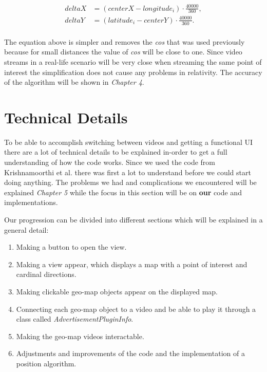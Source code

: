 \begin{align*}
deltaX &= (centerX-longitude_i)\cdot\frac{40000}{360}, \\
deltaY &= (latitude_i-centerY)\cdot\frac{40000}{360}. \\
\end{align*}

The equation above is simpler and removes the \textit{cos} that was used previously because for small distances the value of \textit{cos} will be close to one. Since video streams in a real-life scenario will be very close when streaming the same point of interest the simplification does not cause any problems in relativity. The accuracy of the algorithm will be shown in \textit{Chapter 4}.

\section{Technical Details}
\label{sec:technicaldetails}

To be able to accomplish switching between videos and getting a functional UI there are a lot of technical details to be explained in-order to get a full understanding of how the code works. Since we used the code from Krishnamoorthi et al. \cite{qualbranch} there was first a lot to understand before we could start doing anything. The problems we had and complications we encountered will be explained \textit{Chapter 5} while the focus in this section will be on \textbf{our} code and implementations. 

Our progression can be divided into different sections which will be explained in a general detail:

\begin{enumerate}
\item Making a button to open the view.

\item Making a view appear, which displays a map with a point of interest and cardinal directions.

\item Making clickable geo-map objects appear on the displayed map.

\item Connecting each geo-map object to a video and be able to play it through a class called \textit{AdvertisementPluginInfo}.

\item Making the geo-map videos interactable.


\item Adjustments and improvements of the code and the implementation of a position algorithm. 
\end{enumerate}

